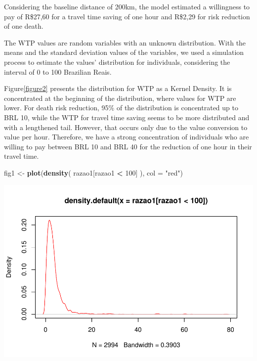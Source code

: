 \documentclass[]{elsarticle} %
\makeatletter
\newenvironment{Shaded}{\begin{snugshade}}{\end{snugshade}}
\newcommand{\DataTypeTok}[1]{\textcolor[rgb]{0.13,0.29,0.53}{#1}}
\newcommand{\DecValTok}[1]{\textcolor[rgb]{0.00,0.00,0.81}{#1}}
\newcommand{\KeywordTok}[1]{\textcolor[rgb]{0.13,0.29,0.53}{\textbf{#1}}}
\newcommand{\NormalTok}[1]{#1}
\newcommand{\OperatorTok}[1]{\textcolor[rgb]{0.81,0.36,0.00}{\textbf{#1}}}
\newcommand{\StringTok}[1]{\textcolor[rgb]{0.31,0.60,0.02}{#1}}
\def\maxwidth{\ifdim\Gin@nat@width>\linewidth\linewidth
\else\Gin@nat@width\fi}
\let\Oldincludegraphics\includegraphics
\renewcommand{\includegraphics}[1]{\Oldincludegraphics[width=\maxwidth]{#1}}
\makeatother
\begin{document}
Considering the baseline distance of 200km, the model estimated a
willingness to pay of R\$27,60 for a travel time saving of one hour and
R\$2,29 for risk reduction of one death.

The WTP values are random variables with an unknown distribution. With
the means and the standard deviation values of the variables, we used a
simulation process to estimate the values' distribution for individuals,
considering the interval of 0 to 100 Brazilian Reais.

Figure\ref{figure2} presents the distribution for WTP as a Kernel
Density. It is concentrated at the beginning of the distribution, where
values for WTP are lower. For death risk reduction, 95\% of the
distribution is concentrated up to BRL 10, while the WTP for travel time
saving seems to be more distributed and with a lengthened tail. However,
that occurs only due to the value conversion to value per hour.
Therefore, we have a strong concentration of individuals who are willing
to pay between BRL 10 and BRL 40 for the reduction of one hour in their
travel time.

\begin{Shaded}
\begin{Highlighting}[]
\NormalTok{fig1 <-}\StringTok{ }\KeywordTok{plot}\NormalTok{(}\KeywordTok{density}\NormalTok{( razao1[razao1 }\OperatorTok{<}\StringTok{ }\DecValTok{100}\NormalTok{] ), }\DataTypeTok{col =} \StringTok{"red"}\NormalTok{)}
\end{Highlighting}
\end{Shaded}

\includegraphics{WTP_transport_files/figure-latex/figure2-1.pdf}
\end{document}
